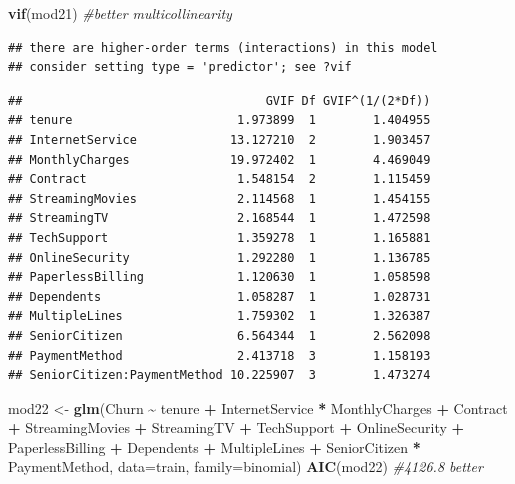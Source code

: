 \documentclass[
  twoside]{article}
\newenvironment{Shaded}{\begin{snugshade}}{\end{snugshade}}
\newcommand{\AttributeTok}[1]{\textcolor[rgb]{0.13,0.29,0.53}{#1}}
\newcommand{\CommentTok}[1]{\textcolor[rgb]{0.56,0.35,0.01}{\textit{#1}}}
\newcommand{\FunctionTok}[1]{\textcolor[rgb]{0.13,0.29,0.53}{\textbf{#1}}}
\newcommand{\NormalTok}[1]{#1}
\newcommand{\OtherTok}[1]{\textcolor[rgb]{0.56,0.35,0.01}{#1}}
\newcommand{\SpecialCharTok}[1]{\textcolor[rgb]{0.81,0.36,0.00}{\textbf{#1}}}
\begin{document}
\begin{Shaded}
\begin{Highlighting}[]
\FunctionTok{vif}\NormalTok{(mod21) }\CommentTok{\#better multicollinearity}
\end{Highlighting}
\end{Shaded}

\begin{verbatim}
## there are higher-order terms (interactions) in this model
## consider setting type = 'predictor'; see ?vif
\end{verbatim}

\begin{verbatim}
##                                  GVIF Df GVIF^(1/(2*Df))
## tenure                       1.973899  1        1.404955
## InternetService             13.127210  2        1.903457
## MonthlyCharges              19.972402  1        4.469049
## Contract                     1.548154  2        1.115459
## StreamingMovies              2.114568  1        1.454155
## StreamingTV                  2.168544  1        1.472598
## TechSupport                  1.359278  1        1.165881
## OnlineSecurity               1.292280  1        1.136785
## PaperlessBilling             1.120630  1        1.058598
## Dependents                   1.058287  1        1.028731
## MultipleLines                1.759302  1        1.326387
## SeniorCitizen                6.564344  1        2.562098
## PaymentMethod                2.413718  3        1.158193
## SeniorCitizen:PaymentMethod 10.225907  3        1.473274
\end{verbatim}

\begin{Shaded}
\begin{Highlighting}[]
\NormalTok{mod22 }\OtherTok{\textless{}{-}} \FunctionTok{glm}\NormalTok{(Churn }\SpecialCharTok{\textasciitilde{}}\NormalTok{ tenure }\SpecialCharTok{+}\NormalTok{ InternetService }\SpecialCharTok{*}\NormalTok{ MonthlyCharges }\SpecialCharTok{+}\NormalTok{ Contract }\SpecialCharTok{+}\NormalTok{ StreamingMovies }\SpecialCharTok{+}\NormalTok{ StreamingTV }\SpecialCharTok{+}\NormalTok{ TechSupport }\SpecialCharTok{+}\NormalTok{ OnlineSecurity }\SpecialCharTok{+}\NormalTok{ PaperlessBilling }\SpecialCharTok{+}\NormalTok{ Dependents }\SpecialCharTok{+}\NormalTok{ MultipleLines }\SpecialCharTok{+}\NormalTok{ SeniorCitizen }\SpecialCharTok{*}\NormalTok{ PaymentMethod, }\AttributeTok{data=}\NormalTok{train, }\AttributeTok{family=}\NormalTok{binomial)}
\FunctionTok{AIC}\NormalTok{(mod22) }\CommentTok{\#4126.8 better}
\end{Highlighting}
\end{Shaded}
\end{document}
